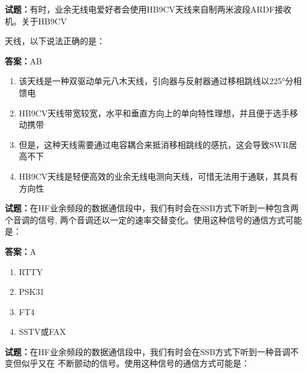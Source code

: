 \documentclass{ctexbook}
\begin{document}
\vspace{1em}

\textbf{试题：}有时，业余无线电爱好者会使用HB9CV天线来自制两米波段ARDF接收机。关于HB9CV


天线，以下说法正确的是： 

\textbf{答案：}AB 

\begin{enumerate}[leftmargin=3em]
  \item 该天线是一种双驱动单元八木天线，引向器与反射器通过移相跳线以225°分相馈电 

  \item HB9CV天线带宽较宽，水平和垂直方向上的单向特性理想，并且便于选手移动携带 

  \item 但是，这种天线需要通过电容耦合来抵消移相跳线的感抗，这会导致SWR居高不下 

  \item HB9CV天线是轻便高效的业余无线电测向天线，可惜无法用于通联，其具有方向性 

\end{enumerate}





\vspace{1em}

\textbf{试题：}在HF业余频段的数据通信段中，我们有时会在SSB方式下听到一种包含两个音调的信号,
两个音调还以一定的速率交替变化。使用这种信号的通信方式可能是： 

\textbf{答案：}A 

\begin{enumerate}[leftmargin=3em]
  \item RTTY 

  \item PSK31 

  \item FT4 

  \item SSTV或FAX 

\end{enumerate}





\vspace{1em}

\textbf{试题：}在HF业余频段的数据通信段中，我们有时会在SSB方式下听到一种音调不变但似乎又在
不断颤动的信号。使用这种信号的通信方式可能是： 
\end{document}
